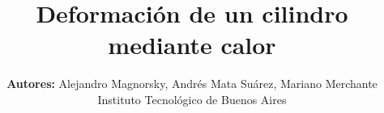 \documentclass[journal, monochrome]{IEEEtran}
\begin{document}
%
\title{Deformación de un cilindro mediante calor}
%
%
%

\author{\textbf{Autores:} Alejandro Magnorsky, Andrés Mata Suárez, Mariano Merchante \\[5px]
        Instituto Tecnológico de Buenos Aires}
        
% 
%



% 




\end{document}

